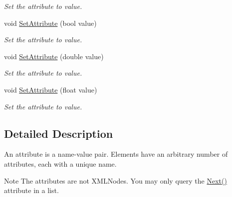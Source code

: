 \begin{DoxyCompactItemize}
\begin{DoxyCompactList}\small\item\em Set the attribute to value. \end{DoxyCompactList}\item 
\hypertarget{classtinyxml2_1_1_x_m_l_attribute_a2b63773f8630df9872a2334b4d7995a4}{void \hyperlink{classtinyxml2_1_1_x_m_l_attribute_a2b63773f8630df9872a2334b4d7995a4}{Set\-Attribute} (bool value)}\label{classtinyxml2_1_1_x_m_l_attribute_a2b63773f8630df9872a2334b4d7995a4}

\begin{DoxyCompactList}\small\item\em Set the attribute to value. \end{DoxyCompactList}\item 
\hypertarget{classtinyxml2_1_1_x_m_l_attribute_a807ec15da774e6b88c3e9bed8d843e54}{void \hyperlink{classtinyxml2_1_1_x_m_l_attribute_a807ec15da774e6b88c3e9bed8d843e54}{Set\-Attribute} (double value)}\label{classtinyxml2_1_1_x_m_l_attribute_a807ec15da774e6b88c3e9bed8d843e54}

\begin{DoxyCompactList}\small\item\em Set the attribute to value. \end{DoxyCompactList}\item 
\hypertarget{classtinyxml2_1_1_x_m_l_attribute_a137058a662de4a16c89485808594b3dc}{void \hyperlink{classtinyxml2_1_1_x_m_l_attribute_a137058a662de4a16c89485808594b3dc}{Set\-Attribute} (float value)}\label{classtinyxml2_1_1_x_m_l_attribute_a137058a662de4a16c89485808594b3dc}

\begin{DoxyCompactList}\small\item\em Set the attribute to value. \end{DoxyCompactList}\end{DoxyCompactItemize}


\subsection{Detailed Description}
An attribute is a name-\/value pair. Elements have an arbitrary number of attributes, each with a unique name.

\begin{DoxyNote}{Note}
The attributes are not X\-M\-L\-Nodes. You may only query the \hyperlink{classtinyxml2_1_1_x_m_l_attribute_a2d36543d8aa40bbf091730f1b733ecdc}{Next()} attribute in a list. 
\end{DoxyNote}


